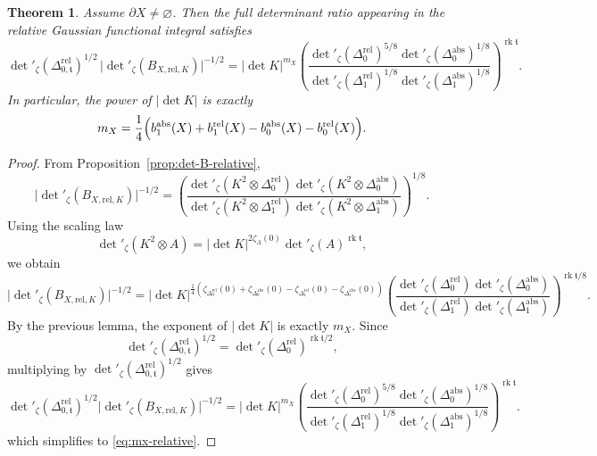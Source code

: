 \documentclass[12pt]{amsart}
\numberwithin{equation}{section}
\newtheorem{theorem}{Theorem}[section]
\newcommand{\rk}{\operatorname{rk}}
\begin{document}
\begin{theorem}
\label{thm:mx-relative}
Assume \(\partial X\neq\varnothing\). Then the full determinant ratio appearing in the relative
Gaussian functional integral satisfies
\begin{equation}
\label{eq:mx-relative}
\det\nolimits'_{\zeta}(\Delta^{\mathrm{rel}}_{0,\mathfrak t})^{1/2}
\,
\bigl|\det\nolimits'_{\zeta}(B_{X,\mathrm{rel},K})\bigr|^{-1/2}
=
|\det K|^{m_X}
\left(
\frac{
\det\nolimits'_{\zeta}(\Delta_0^{\mathrm{rel}})^{5/8}
\det\nolimits'_{\zeta}(\Delta_0^{\mathrm{abs}})^{1/8}
}{
\det\nolimits'_{\zeta}(\Delta_1^{\mathrm{rel}})^{1/8}
\det\nolimits'_{\zeta}(\Delta_1^{\mathrm{abs}})^{1/8}
}
\right)^{\rk \mathfrak t}.
\end{equation}
In particular, the power of \(|\det K|\) is exactly
\[
m_X
=
\frac14\Bigl(
b_1^{\mathrm{abs}}(X)+b_1^{\mathrm{rel}}(X)
-b_0^{\mathrm{abs}}(X)-b_0^{\mathrm{rel}}(X)
\Bigr).
\]
\end{theorem}
\begin{proof}
From Proposition~\ref{prop:det-B-relative},
\[
\bigl|\det\nolimits'_{\zeta}(B_{X,\mathrm{rel},K})\bigr|^{-1/2}
=
\left(
\frac{
\det\nolimits'_{\zeta}(K^2\otimes\Delta_0^{\mathrm{rel}})
\det\nolimits'_{\zeta}(K^2\otimes\Delta_0^{\mathrm{abs}})
}{
\det\nolimits'_{\zeta}(K^2\otimes\Delta_1^{\mathrm{rel}})
\det\nolimits'_{\zeta}(K^2\otimes\Delta_1^{\mathrm{abs}})
}
\right)^{1/8}.
\]
Using the scaling law
\[
\det\nolimits'_{\zeta}(K^2\otimes A)
=
|\det K|^{2\zeta_A(0)}\det\nolimits'_{\zeta}(A)^{\operatorname{rk}\mathfrak t},
\]
we obtain
\[
\bigl|\det\nolimits'_{\zeta}(B_{X,\mathrm{rel},K})\bigr|^{-1/2}
=
|\det K|^{\frac14\left(
\zeta_{\Delta_0^{\mathrm{rel}}}(0)+\zeta_{\Delta_0^{\mathrm{abs}}}(0)
-\zeta_{\Delta_1^{\mathrm{rel}}}(0)-\zeta_{\Delta_1^{\mathrm{abs}}}(0)
\right)}
\left(
\frac{
\det\nolimits'_{\zeta}(\Delta_0^{\mathrm{rel}})
\det\nolimits'_{\zeta}(\Delta_0^{\mathrm{abs}})
}{
\det\nolimits'_{\zeta}(\Delta_1^{\mathrm{rel}})
\det\nolimits'_{\zeta}(\Delta_1^{\mathrm{abs}})
}
\right)^{\operatorname{rk}\mathfrak t/8}.
\]
By the previous lemma, the exponent of $|\det K|$ is exactly $m_X$. Since
\[
\det\nolimits'_{\zeta}(\Delta_{0,\mathfrak t}^{\mathrm{rel}})^{1/2}
=
\det\nolimits'_{\zeta}(\Delta_0^{\mathrm{rel}})^{\operatorname{rk}\mathfrak t/2},
\]
multiplying by \(\det\nolimits'_{\zeta}(\Delta_{0,\mathfrak t}^{\mathrm{rel}})^{1/2}\) gives
\[
\det\nolimits'_{\zeta}(\Delta_{0,\mathfrak t}^{\mathrm{rel}})^{1/2}
\bigl|\det\nolimits'_{\zeta}(B_{X,\mathrm{rel},K})\bigr|^{-1/2}
=
|\det K|^{m_X}
\left(
\frac{
\det\nolimits'_{\zeta}(\Delta_0^{\mathrm{rel}})^{5/8}
\det\nolimits'_{\zeta}(\Delta_0^{\mathrm{abs}})^{1/8}
}{
\det\nolimits'_{\zeta}(\Delta_1^{\mathrm{rel}})^{1/8}
\det\nolimits'_{\zeta}(\Delta_1^{\mathrm{abs}})^{1/8}
}
\right)^{\operatorname{rk}\mathfrak t}.
\]
which simplifies to \eqref{eq:mx-relative}.
\end{proof}
\end{document}
